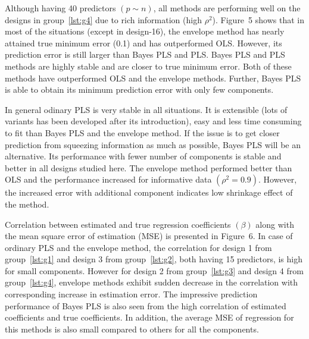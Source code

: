 \documentclass[a4paper, 11pt]{article}
\begin{document}

Although having 40 predictors $(p\sim n)$, all methods are performing well on the designs in group~\ref{lst:g4} due to rich information (high $\rho^2$). Figure~5 shows that in most of the situations (except in design-16), the envelope method has nearly attained true minimum error (0.1) and has outperformed OLS. However, its prediction error is still larger than Bayes PLS and PLS. Bayes PLS and PLS methods are highly stable and are closer to true minimum error. Both of these methods have outperformed OLS and the envelope methods. Further, Bayes PLS is able to obtain its minimum prediction error with only few components. 

In general odinary PLS is very stable in all situations. It is extensible (lots of variants has been developed after its introduction), easy and less time consuming to fit than Bayes PLS and the envelope method. If the issue is to get closer prediction from squeezing information as much as possible, Bayes PLS will be an alternative. Its performance with fewer number of components is stable and better in all designs studied here. The envelope method performed better than OLS and the performance increased for informative data $(\rho^2 = 0.9)$. However, the increased error with additional component indicates low shrinkage effect of the
method.

Correlation between estimated and true regression coefficients $(\beta)$ along with the mean square error of estimation (MSE) is presented in Figure~6. In case of ordinary PLS and the envelope method, the correlation for design 1 from group~\ref{lst:g1} and design 3 from group~\ref{lst:g2}, both having 15 predictors, is high for small components. However for design 2 from group~\ref{lst:g3} and design 4 from group~\ref{lst:g4}, envelope methods exhibit sudden decrease in the correlation with corresponding increase in estimation error. The impressive prediction performance of Bayes PLS is also seen from the high correlation of estimated coefficients and true coefficients. In addition, the average MSE of regression for this methods is also small compared to others for all the components. 
\end{document}
